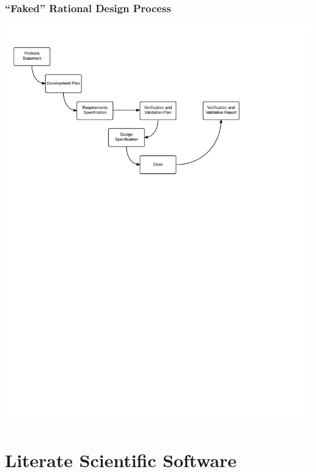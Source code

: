 \documentclass{beamer}
\begin{document}
\begin{frame}

\frametitle{``Faked'' Rational Design Process}

\begin{center}
\includegraphics[scale=0.6]{OverviewOfProcess.pdf}
\end{center}

\end{frame}


\section[Lit.\ SS]{Literate Scientific Software}

\end{document}
